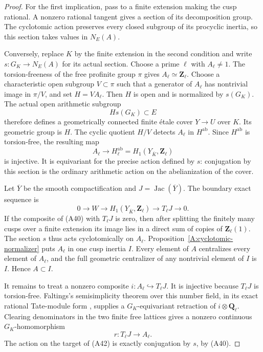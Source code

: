 \documentclass[11pt,oneside]{article}
\begin{document}
\begin{proof}
For the first implication, pass to a finite extension
making the cusp rational. A nonzero rational tangent
gives a section of its decomposition group. The
cyclotomic action preserves every closed subgroup
of its procyclic inertia, so this section takes
values in $N_E(A)$.

Conversely, replace $K$ by the finite extension
in the second condition and write
$s:G_K\to N_E(A)$ for its actual section.
Choose a prime $\ell$ with $A_\ell\ne1$.
The torsion-freeness of the free profinite group
$\pi$ gives $A_\ell\simeq\mathbf Z_\ell$.
Choose a characteristic open subgroup $V\subset\pi$
such that a generator of $A_\ell$ has nontrivial
image in $\pi/V$, and set $H=V A_\ell$.
Then $H$ is open and is normalized by $s(G_K)$.
The actual open arithmetic subgroup
\[
                         Hs(G_K)\subset E
\]
therefore defines a geometrically connected finite
\'etale cover $Y\to U$ over $K$. Its geometric
group is $H$. The cyclic quotient $H/V$ detects
$A_\ell$ in $H^{\mathrm{ab}}$.
Since $H^{\mathrm{ab}}$ is torsion-free, the resulting
map
\[
 A_\ell\longrightarrow H^{\mathrm{ab}}_{\ell}
       =H_1(Y_{\overline K},\mathbf Z_\ell)
                                                        \tag{A40}
\]
is injective. It is equivariant for the precise
action defined by $s$: conjugation by this section
is the ordinary arithmetic action on the
abelianization of the cover.

Let $\overline Y$ be the smooth compactification
and $J=\operatorname{Jac}(\overline Y)$. The
boundary exact sequence is
\[
 0\longrightarrow W\longrightarrow H_1(Y_{\overline K},\mathbf Z_\ell)
       \longrightarrow T_\ell J\longrightarrow0.
                                                        \tag{A41}
\]
If the composite of (A40) with $T_\ell J$ is zero,
then after splitting the finitely many cusps over
a finite extension its image lies in a direct
sum of copies of $\mathbf Z_\ell(1)$. The section
$s$ thus acts cyclotomically on $A_\ell$.
Proposition~\ref{A:cyclotomic-normalizer} puts
$A_\ell$ in one cusp inertia $I$.
Every element of $A$ centralizes every element
of $A_\ell$, and the full geometric centralizer
of any nontrivial element of $I$ is $I$.
Hence $A\subset I$.

It remains to treat a nonzero composite
$i:A_\ell\hookrightarrow T_\ell J$.
It is injective because $T_\ell J$ is torsion-free.
Faltings's semisimplicity theorem over this number
field, in its exact rational Tate-module form
\cite[\S5, Satz 3]{Faltings1983}, supplies a
$G_K$-equivariant retraction of
$i\otimes\mathbf Q_\ell$. Clearing denominators
in the two finite free lattices gives a nonzero
continuous $G_K$-homomorphism
\[
                 r:T_\ell J\longrightarrow A_\ell.
                                                        \tag{A42}
\]
The action on the target of (A42) is exactly
conjugation by $s$, by (A40).


\end{proof}
\end{document}
